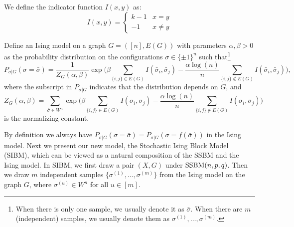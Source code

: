 \documentclass{article}
\begin{document}
We define the indicator function $I(x, y)$ as:
\begin{equation}
I(x, y) = \begin{cases}
 k-1 & x = y \\
 -1 & x \neq y
\end{cases}
\end{equation}

 
 \begin{definition}
Define an Ising model on a graph $G=([n],E(G))$ with parameters $\alpha,\beta>0$ as the probability distribution on the configurations $\sigma\in\{\pm 1\}^n$ such that\footnote{When there is only one sample, we usually denote it as $\bar{\sigma}$. When there are $m$ (independent) samples, we usually denote them as $\sigma^{(1)},\dots,\sigma^{(m)}$.}
\begin{equation} \label{eq:isingma}
P_{\sigma|G}(\sigma=\bar{\sigma})=\frac{1}{Z_G(\alpha,\beta)}
\exp\Big(\beta\sum_{\{i,j\}\in E(G)} I(\bar{\sigma}_i ,\bar{\sigma}_j)
-\frac{\alpha\log(n)}{n} \sum_{\{i,j\}\notin E(G)} I(\bar{\sigma}_i, \bar{\sigma}_j)\Big) ,
\end{equation}
where the subscript in $P_{\sigma|G}$ indicates that the distribution depends on $G$, and 
\begin{equation}  \label{eq:zg}
Z_G(\alpha,\beta)=\sum_{\bar{\sigma} \in W^n} \exp\Big(\beta\sum_{\{i,j\}\in E(G)}I(\bar{\sigma}_i, \bar{\sigma}_j)
-\frac{\alpha\log(n)}{n} \sum_{\{i,j\}\notin E(G)} I(\bar{\sigma}_i, \bar{\sigma}_j) \Big) 
\end{equation}
is the normalizing constant.
\end{definition}






By definition we always have $P_{\sigma|G}(\sigma=\bar{\sigma})=P_{\sigma|G}(\sigma=f(\bar{\sigma}))$ in the Ising model. Next we present our new model, the Stochastic Ising Block Model (SIBM), which can be viewed as a natural composition of the SSBM and the Ising model. In SIBM, we first draw a pair $(X,G)$ under $\operatorname{SSBM}(n,p,q)$.  Then we draw $m$ independent samples $\{\sigma^{(1)},\dots,\sigma^{(m)}\}$ from the Ising model on the graph $G$, where $\sigma^{(u)}\in W^n$ for all $u\in[m]$.
\end{document}
